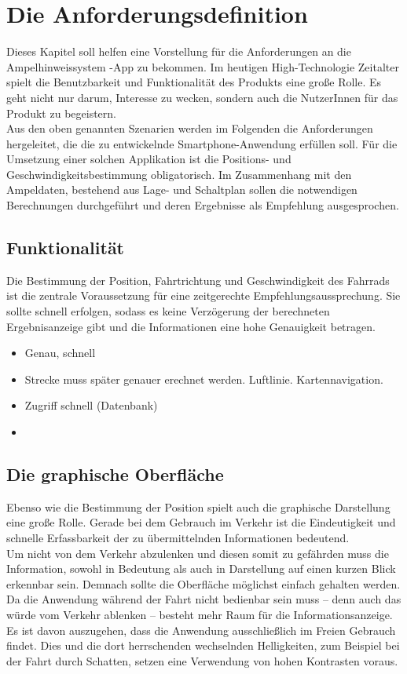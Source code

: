 \chapter{Die Anforderungsdefinition}
Dieses Kapitel soll helfen eine Vorstellung für die Anforderungen an die Ampelhinweissystem -App zu bekommen. Im heutigen High-Technologie Zeitalter spielt die Benutzbarkeit und Funktionalität des Produkts eine große Rolle. Es geht nicht nur darum, Interesse zu wecken, sondern auch die NutzerInnen für das Produkt zu begeistern. \\
Aus den oben genannten Szenarien werden im Folgenden die Anforderungen hergeleitet, die die zu entwickelnde \gls{Smartphone}-Anwendung erfüllen soll. Für die Umsetzung einer solchen Applikation ist die Positions- und Geschwindigkeitsbestimmung obligatorisch. Im Zusammenhang mit den Ampeldaten, bestehend aus Lage- und Schaltplan sollen die notwendigen Berechnungen durchgeführt und deren Ergebnisse als Empfehlung ausgesprochen.
\section{Funktionalität}
Die Bestimmung der Position, Fahrtrichtung und Geschwindigkeit des Fahrrads ist die zentrale Voraussetzung für eine zeitgerechte Empfehlungsaussprechung. Sie sollte schnell erfolgen, sodass es keine Verzögerung der berechneten Ergebnisanzeige gibt und die Informationen eine hohe Genauigkeit betragen. \\

\begin{itemize}
	\item Genau, schnell
	\item Strecke muss später genauer erechnet werden. Luftlinie. Kartennavigation.
	\item Zugriff schnell (Datenbank)
	\item 
\end{itemize}

\section{Die graphische Oberfläche}
Ebenso wie die Bestimmung der Position spielt auch die graphische Darstellung eine große Rolle. Gerade bei dem Gebrauch im Verkehr ist die Eindeutigkeit und schnelle Erfassbarkeit der zu übermittelnden Informationen bedeutend.  \\
Um nicht von dem Verkehr abzulenken und diesen somit zu gefährden muss die Information, sowohl in Bedeutung als auch in Darstellung auf einen kurzen Blick erkennbar sein. Demnach sollte die Oberfläche möglichst einfach gehalten werden.\\
Da die Anwendung während der Fahrt nicht bedienbar sein muss -- denn auch das würde vom Verkehr ablenken -- besteht mehr Raum für die Informationsanzeige. 
Es ist davon auszugehen, dass die Anwendung ausschließlich im Freien Gebrauch findet. Dies und die dort herrschenden wechselnden Helligkeiten, zum Beispiel bei der Fahrt durch Schatten, setzen eine Verwendung von hohen Kontrasten voraus.
